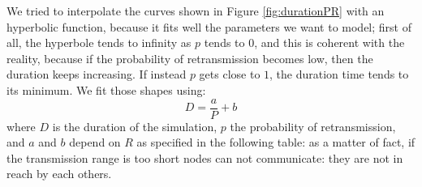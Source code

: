 We tried to interpolate the curves shown in Figure \ref{fig:durationPR}
with an hyperbolic function, because it fits well the parameters we want to
model; first of all, the hyperbole tends to infinity as $p$ tends to $0$, and
this is coherent with the reality, because if the probability of retransmission
becomes low, then the duration keeps increasing. If instead $p$ gets close to
$1$, the duration time tends to its minimum. We fit those shapes using:
\begin{equation*}  
    D = \frac{a}{P}+b 
\end{equation*}
where $D$ is the duration of the simulation, $p$ the probability of
retransmission, and $a$ and $b$ depend on $R$ as specified in the following
table:
as a matter of fact, if the transmission range is
too short nodes can not communicate: they are not in reach by each others.\\
\\

